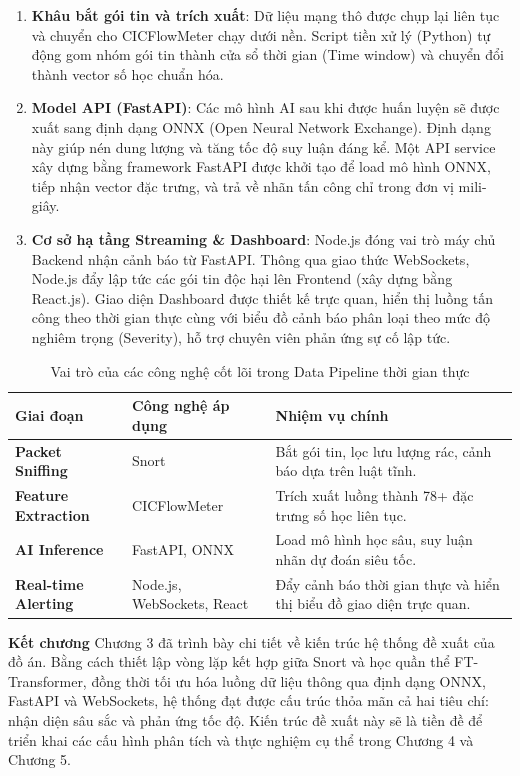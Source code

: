 \documentclass[../DoAn.tex]{subfiles}
\begin{document}
\begin{enumerate}
    \item \textbf{Khâu bắt gói tin và trích xuất}: Dữ liệu mạng thô được chụp lại liên tục và chuyển cho CICFlowMeter chạy dưới nền. Script tiền xử lý (Python) tự động gom nhóm gói tin thành cửa sổ thời gian (Time window) và chuyển đổi thành vector số học chuẩn hóa.
    \item \textbf{Model API (FastAPI)}: Các mô hình AI sau khi được huấn luyện sẽ được xuất sang định dạng ONNX (Open Neural Network Exchange). Định dạng này giúp nén dung lượng và tăng tốc độ suy luận đáng kể. Một API service xây dựng bằng framework FastAPI được khởi tạo để load mô hình ONNX, tiếp nhận vector đặc trưng, và trả về nhãn tấn công chỉ trong đơn vị mili-giây.
    \item \textbf{Cơ sở hạ tầng Streaming \& Dashboard}: Node.js đóng vai trò máy chủ Backend nhận cảnh báo từ FastAPI. Thông qua giao thức WebSockets, Node.js đẩy lập tức các gói tin độc hại lên Frontend (xây dựng bằng React.js). Giao diện Dashboard được thiết kế trực quan, hiển thị luồng tấn công theo thời gian thực cùng với biểu đồ cảnh báo phân loại theo mức độ nghiêm trọng (Severity), hỗ trợ chuyên viên phản ứng sự cố lập tức.
\end{enumerate}

\begin{table}[htbp]
\centering
\caption{Vai trò của các công nghệ cốt lõi trong Data Pipeline thời gian thực}
\label{tab:tech_pipeline}
\begin{tabular}{|l|p{3.5cm}|p{7cm}|}
\hline
\textbf{Giai đoạn} & \textbf{Công nghệ áp dụng} & \textbf{Nhiệm vụ chính} \\
\hline
\textbf{Packet Sniffing} & Snort & Bắt gói tin, lọc lưu lượng rác, cảnh báo dựa trên luật tĩnh. \\
\hline
\textbf{Feature Extraction} & CICFlowMeter & Trích xuất luồng thành 78+ đặc trưng số học liên tục. \\
\hline
\textbf{AI Inference} & FastAPI, ONNX & Load mô hình học sâu, suy luận nhãn dự đoán siêu tốc. \\
\hline
\textbf{Real-time Alerting} & Node.js, WebSockets, React & Đẩy cảnh báo thời gian thực và hiển thị biểu đồ giao diện trực quan. \\
\hline
\end{tabular}
\end{table}

\vspace{1em}
\textbf{Kết chương}
Chương 3 đã trình bày chi tiết về kiến trúc hệ thống đề xuất của đồ án. Bằng cách thiết lập vòng lặp kết hợp giữa Snort và học quần thể FT-Transformer, đồng thời tối ưu hóa luồng dữ liệu thông qua định dạng ONNX, FastAPI và WebSockets, hệ thống đạt được cấu trúc thỏa mãn cả hai tiêu chí: nhận diện sâu sắc và phản ứng tốc độ. Kiến trúc đề xuất này sẽ là tiền đề để triển khai các cấu hình phân tích và thực nghiệm cụ thể trong Chương 4 và Chương 5.
\end{document}

